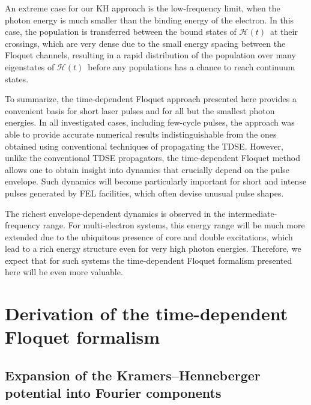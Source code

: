 \documentclass[
pra%
,preprint%
,amssymb, nobibnotes, aps, superscriptaddress, floatfix]{revtex4}
\newcommand{\av}{\boldsymbol{\alpha}}
\newcommand{\CAHt}{$\mathcal{H}(t)$}
\newcommand{\phase}{\phi}
\begin{document}
An extreme case for our KH approach is the low-frequency limit, when the photon energy is much smaller than the binding energy of the electron. In this case, the population is transferred between the bound states of \CAHt\ at their crossings, which are very dense due to the small energy spacing between the Floquet channels, resulting in a rapid distribution of the population over many eigenstates of \CAHt\ before any populations has a chance to reach continuum states.

To summarize, the time-dependent Floquet approach presented here provides a convenient basis for short laser pulses and for all but the smallest photon energies. In all investigated cases, including few-cycle pulses, the approach was able to provide accurate numerical results indistinguishable from the ones obtained using conventional techniques of propagating the TDSE. However, unlike the conventional TDSE propagators, the time-dependent Floquet method allows one to obtain insight into dynamics that crucially depend on the pulse envelope. Such dynamics  will become particularly important for short and intense pulses generated by FEL facilities, which often devise unusual pulse
shapes.

The richest envelope-dependent dynamics is observed in the intermediate-frequency range. For multi-electron systems, this energy range will be much more extended due to the ubiquitous presence of core and double excitations, which lead to a rich energy structure even for very high photon energies. Therefore, we expect that for such systems the time-dependent Floquet formalism presented here will be even more valuable.




%
%
%
%
\pagebreak
\appendix
\section{Derivation of the time-dependent Floquet formalism}\label{sec:app_expansions}

\subsection{Expansion of the Kramers--Henneberger potential into Fourier components}

\end{document}
